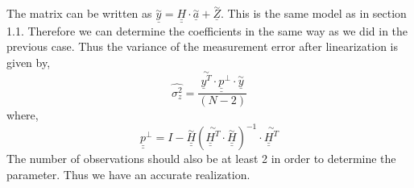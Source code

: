 \noindent The matrix can be written as $\underline{\overset{\sim}{y}} = \underline{\underline{H}} \cdot \underline{\overset{\sim}{a}} + \underline{\overset{\sim}{Z}}$.
\noindent This is the same model as in section 1.1. Therefore we can determine the coefficients in the same way as we did in the previous case. Thus the variance of the measurement error after linearization is given by,
$$\hat{\sigma_z^2} =\frac{\overset{\sim}{\underline{y}^T} \cdot \underline{\underline{p}}^{\bot}\cdot \underline{\overset{\sim}{y}}}{(N - 2)}$$
where,
$$\underline{\underline{p}}^{\bot} = I -  \overset{\sim}{\underline{\underline{H}}} (\overset{\sim}{\underline{\underline{H}}^T}   \cdot \overset{\sim}{\underline{\underline{H}}})^{-1}  \cdot  \overset{\sim}{\underline{\underline{H}}^T} $$
\noindent The number of observations should also be at least 2 in order to determine the parameter. Thus we have an accurate realization.\\
